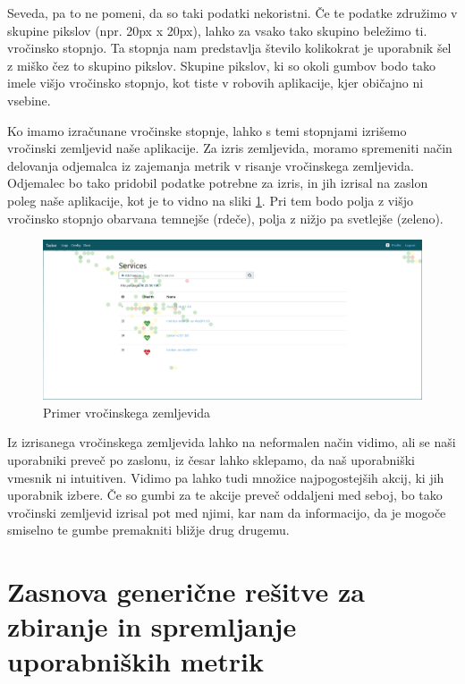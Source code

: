 \documentclass[a4paper, 12pt]{book}
\begin{document}
Seveda, pa to ne pomeni, da so taki podatki nekoristni. Če te podatke združimo v skupine pikslov (npr. 20px x 20px), lahko za vsako tako skupino beležimo ti. vročinsko stopnjo. Ta stopnja nam predstavlja število kolikokrat je uporabnik šel z miško čez to skupino pikslov. Skupine pikslov, ki so okoli gumbov bodo tako imele višjo vročinsko stopnjo, kot tiste v robovih aplikacije, kjer običajno ni vsebine.

Ko imamo izračunane vročinske stopnje, lahko s temi stopnjami izrišemo vročinski zemljevid naše aplikacije. Za izris zemljevida, moramo spremeniti način delovanja odjemalca iz zajemanja metrik v risanje vročinskega zemljevida. Odjemalec bo tako pridobil podatke potrebne za izris, in jih izrisal na zaslon poleg naše aplikacije, kot je to vidno na sliki \ref{img:heatmap}. Pri tem bodo polja z višjo vročinsko stopnjo obarvana temnejše (rdeče), polja z nižjo pa svetlejše (zeleno).

\begin{figure}[h]
	\begin{center}
		\includegraphics[width=1\textwidth]{heatmap_1.png}
	\end{center}
	\caption{Primer vročinskega zemljevida}
	\label{img:heatmap}
\end{figure}

Iz izrisanega vročinskega zemljevida lahko na neformalen način vidimo, ali se naši uporabniki preveč  po zaslonu, iz česar lahko sklepamo, da naš uporabniški vmesnik ni intuitiven. Vidimo pa lahko tudi množice najpogostejših akcij, ki jih uporabnik izbere. Če so gumbi za te akcije preveč oddaljeni med seboj, bo tako vročinski zemljevid izrisal pot med njimi, kar nam da informacijo, da je mogoče smiselno te gumbe premakniti bližje drug drugemu.

\chapter{Zasnova generične rešitve za zbiranje in spremljanje uporabniških metrik}
\label{ch3}
\end{document}
